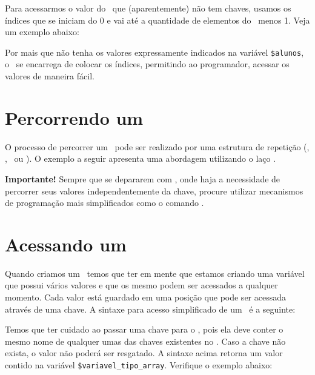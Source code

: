 Para acessarmos o valor do \tipoarray~que (aparentemente) não tem chaves, usamos
os índices que se iniciam do 0 e vai até a quantidade de elementos do \tipoarray~menos 1.
Veja um exemplo abaixo:



Por mais que não tenha os valores expressamente indicados na variável \texttt{\$alunos},
o \php~se encarrega de colocar os índices, permitindo ao programador, acessar os valores
de maneira fácil.

\section{Percorrendo um \tipoarray}
\label{percorrendo-um-array}

O processo de percorrer um \tipoarray~pode ser realizado por uma estrutura de 
repetição (\comandofor, \comandowhile, \comandodowhile~ou \comandoforeach). O exemplo a 
seguir apresenta uma abordagem utilizando o laço \comandoforeach.



\begin{framed}
\textbf{{\Large Importante!}}
Sempre que se depararem com \tipoarrays, onde haja a necessidade de percorrer 
seus valores independentemente da chave, procure utilizar mecanismos de 
programação mais simplificados como o comando \comandoforeach.
\end{framed}

\section{Acessando um \tipoarray}
\label{acessando-um-array}

Quando criamos um \tipoarray~temos que ter em mente que estamos criando uma variável 
que possui vários valores e que os mesmo podem ser acessados a qualquer momento. 
Cada valor está guardado em uma posição que pode ser acessada através de uma chave.
A sintaxe para acesso simplificado de um \tipoarray~é a seguinte:


Temos que ter cuidado ao passar uma chave para o \tipoarray, pois ela deve conter o 
mesmo nome de qualquer umas das chaves existentes no \tipoarray. Caso a chave não exista, 
o valor não poderá ser resgatado. A sintaxe acima retorna um valor contido na variável 
\texttt{\$variavel\_tipo\_array}. Verifique o exemplo abaixo: 

